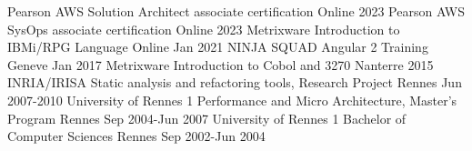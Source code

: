 
\begin{cventries}
\cventry
{Pearson} %
{AWS Solution Architect associate certification} %
{Online} %
{2023} %
{
}
\cventry
{Pearson} %
{AWS SysOps associate certification} %
{Online} %
{2023} %
{
}
\cventry
{Metrixware} %
{Introduction to IBMi/RPG Language} %
{Online} %
{Jan 2021} %
{
}
\cventry
{NINJA SQUAD} %
{Angular 2 Training} %
{Geneve} %
{Jan 2017} %
{
}
\cventry
{Metrixware} %
{Introduction to Cobol and 3270} %
{Nanterre} %
{2015} %
{
}
\cventry
{INRIA/IRISA} %
{Static analysis and refactoring tools, Research Project} %
{Rennes} %
{Jun 2007-2010} %
{
}
\cventry
{University of Rennes 1} %
{Performance and Micro Architecture, Master's Program} %
{Rennes} %
{Sep 2004-Jun 2007} %
{
}
\cventry
{University of Rennes 1} %
{Bachelor of Computer Sciences} %
{Rennes} %
{Sep 2002-Jun 2004} %
{
}
\end{cventries}